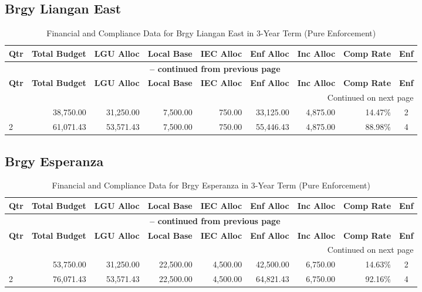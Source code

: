 \subsection{Brgy Liangan East}
\begin{longtable}{lrrrrrrrc}
\caption{Financial and Compliance Data for Brgy Liangan East in 3-Year Term (Pure Enforcement)} \\
\toprule
\textbf{Qtr} & \textbf{Total Budget} & \textbf{LGU Alloc} & \textbf{Local Base} & \textbf{IEC Alloc} & \textbf{Enf Alloc} & \textbf{Inc Alloc} & \textbf{Comp Rate} & \textbf{Enf} \\
\midrule
\endfirsthead
\multicolumn{9}{c}{{\bfseries \tablename\ \thetable{} -- continued from previous page}} \\
\toprule
\textbf{Qtr} & \textbf{Total Budget} & \textbf{LGU Alloc} & \textbf{Local Base} & \textbf{IEC Alloc} & \textbf{Enf Alloc} & \textbf{Inc Alloc} & \textbf{Comp Rate} & \textbf{Enf} \\
\midrule
\endhead
\hline \multicolumn{9}{r}{{Continued on next page}} \\ \hline
\endfoot
\bottomrule
\endlastfoot
1 & 38,750.00 & 31,250.00 & 7,500.00 & 750.00 & 33,125.00 & 4,875.00 & 14.47\% & 2 \\
2 & 61,071.43 & 53,571.43 & 7,500.00 & 750.00 & 55,446.43 & 4,875.00 & 88.98\% & 4 \\
\end{longtable}
\newpage
\subsection{Brgy Esperanza}
\begin{longtable}{lrrrrrrrc}
\caption{Financial and Compliance Data for Brgy Esperanza in 3-Year Term (Pure Enforcement)} \\
\toprule
\textbf{Qtr} & \textbf{Total Budget} & \textbf{LGU Alloc} & \textbf{Local Base} & \textbf{IEC Alloc} & \textbf{Enf Alloc} & \textbf{Inc Alloc} & \textbf{Comp Rate} & \textbf{Enf} \\
\midrule
\endfirsthead
\multicolumn{9}{c}{{\bfseries \tablename\ \thetable{} -- continued from previous page}} \\
\toprule
\textbf{Qtr} & \textbf{Total Budget} & \textbf{LGU Alloc} & \textbf{Local Base} & \textbf{IEC Alloc} & \textbf{Enf Alloc} & \textbf{Inc Alloc} & \textbf{Comp Rate} & \textbf{Enf} \\
\midrule
\endhead
\hline \multicolumn{9}{r}{{Continued on next page}} \\ \hline
\endfoot
\bottomrule
\endlastfoot
1 & 53,750.00 & 31,250.00 & 22,500.00 & 4,500.00 & 42,500.00 & 6,750.00 & 14.63\% & 2 \\
2 & 76,071.43 & 53,571.43 & 22,500.00 & 4,500.00 & 64,821.43 & 6,750.00 & 92.16\% & 4 \\
\end{longtable}
\newpage
